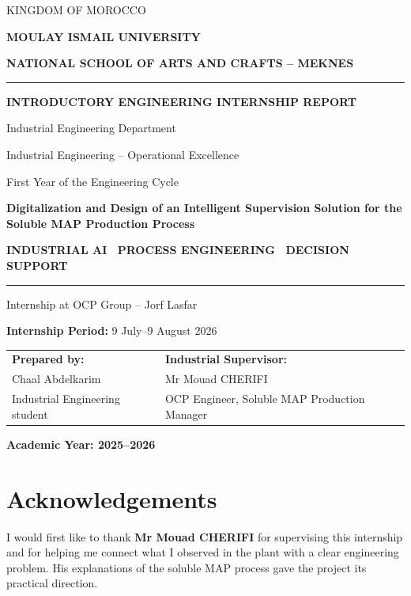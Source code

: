 \begin{titlepage}
\vspace{6mm}
{\small KINGDOM OF MOROCCO\par}
{\bfseries MOULAY ISMAIL UNIVERSITY\par}
{\bfseries NATIONAL SCHOOL OF ARTS AND CRAFTS -- MEKNES\par}
\vspace{7mm}
{\color{ENSAMTeal}\rule{0.88\textwidth}{1.2pt}}\par
\vspace{5mm}
{\Large\bfseries INTRODUCTORY ENGINEERING INTERNSHIP REPORT\par}
\vspace{3mm}
{\small Industrial Engineering Department\par}
{\small Industrial Engineering -- Operational Excellence\par}
{\small First Year of the Engineering Cycle\par}
\vspace{12mm}
{\color{DeepBlue}\fontsize{20}{25}\selectfont\bfseries
Digitalization and Design of an Intelligent Supervision Solution for the Soluble MAP Production Process\par}
\vspace{3mm}
{\small\sffamily\bfseries\color{OCPGreen}\MakeUppercase{Industrial AI \textperiodcentered\ Process Engineering \textperiodcentered\ Decision Support}\par}
\vspace{5mm}
{\color{ENSAMTeal}\rule{0.88\textwidth}{1.2pt}}\par
\vspace{5mm}
{\large Internship at OCP Group -- Jorf Lasfar\par}
{\normalsize \textbf{Internship Period:} 9 July--9 August 2026\par}
\vfill
\begin{tabularx}{0.88\textwidth}{@{}Y Y@{}}
\textbf{Prepared by:} & \textbf{Industrial Supervisor:}\\[1mm]
Chaal Abdelkarim & Mr Mouad CHERIFI\\
Industrial Engineering student & OCP Engineer, Soluble MAP Production Manager\\
\end{tabularx}
\vfill
{\bfseries Academic Year: 2025--2026\par}
\end{titlepage}

\chapter*{Acknowledgements}
I would first like to thank \textbf{Mr Mouad CHERIFI} for supervising this internship and for helping me connect what I observed in the plant with a clear engineering problem. His explanations of the soluble MAP process gave the project its practical direction.

